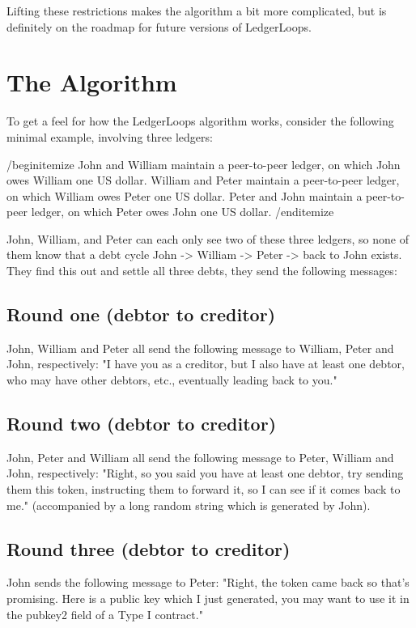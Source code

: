 \documentclass[11pt,twoside,a4paper]{article}
\begin{document}
Lifting these restrictions makes the algorithm a bit more complicated, but is definitely on the roadmap for future versions of LedgerLoops.

\section{The Algorithm}
To get a feel for how the LedgerLoops algorithm works, consider the following minimal example, involving three ledgers:

/begin{itemize}
John and William maintain a peer-to-peer ledger, on which John owes William one US dollar.
William and Peter maintain a peer-to-peer ledger, on which William owes Peter one US dollar.
Peter and John maintain a peer-to-peer ledger, on which Peter owes John one US dollar.
/end{itemize}

John, William, and Peter can each only see two of these three ledgers, so none of them know that a debt cycle
John -> William -> Peter -> back to John exists. They find this out and settle all three debts, they send the
following messages:

\subsection{Round one (debtor to creditor)}
John, William and Peter all send the following message to William, Peter and John, respectively:
"I have you as a creditor, but I also have at least one debtor, who may have other debtors, etc.,
eventually leading back to you."

\subsection{Round two (debtor to creditor)}
John, Peter and William all send the following message to Peter, William and John, respectively:
"Right, so you said you have at least one debtor, try sending them this token, instructing them to forward it,
so I can see if it comes back to me." (accompanied by a long random string which is generated by John).

\subsection{Round three (debtor to creditor)}
John sends the following message to Peter:
"Right, the token came back so that's promising. Here is a public key which I just generated, you may want to use it
in the pubkey2 field of a Type I contract."
\end{document}

